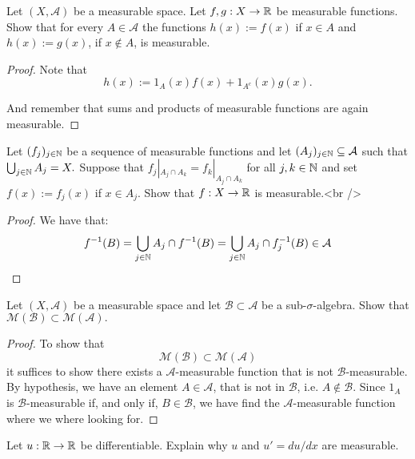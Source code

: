 \begin{thm}[Problem 8.3i]
Let \((X,\mathcal{A})\) be a measurable space. Let \(f,g : X\rightarrow \Bbb{R}\) be measurable functions. Show that for every \(A\in \mathcal{A}\) the functions \(h(x):=f(x)\) if \(x\in A\) and $h(x):=g(x)$, if \(x\not\in A\), is measurable.
\end{thm}

\begin{proof}
Note that
\[
h(x):=1_A(x)f(x)+1_{A^c}(x)g(x).
\]

And remember that sums and products of measurable functions are again measurable.
\end{proof}

\begin{thm}[Problem 8.3ii]
Let \((f_{j})_{j\in \Bbb{N}}\) be a sequence of measurable functions and let \((A_{j})_{j\in \Bbb{N}}\subseteq \mathcal{A}\) such that \(\bigcup _{j\in \Bbb{N}}A_{j}=X.\) Suppose that \(f_{j}|_{A_{j}\cap A_{k}}=f_{k}|_{A_{j}\cap A_{k}}\) for all \(j,k\in \Bbb{N}\) and set \(f(x):=f_{j}(x)\) if \(x\in A_{j}\). Show that \(f:X\rightarrow \Bbb{R}\) is measurable.<br />
\end{thm}

\begin{proof}
We have that:
\[
f^{-1}(B)=\bigcup _{j\in \Bbb{N}}A_{j}\cap f^{-1}(B)=\bigcup _{j\in \Bbb{N}}A_{j}\cap f_{j}^{-1}(B)\in \mathcal{A}
\]
\end{proof}

\begin{thm}[Problem 8.4]
Let \((X,\mathcal{A})\) be a measurable space and let \(\mathcal{B}\subset \mathcal{A}\) be a sub-\(\sigma \)-algebra. Show that \(\mathcal{M}(\mathcal{B})\subset \mathcal{M}(\mathcal{A}).\)
\end{thm}

\begin{proof}
To show that
\[
\mathcal{M}(\mathcal{B})\subset \mathcal{M}(\mathcal{A})
\]
it suffices to show there exists a \(\mathcal{A}\)-measurable function that is not \(\mathcal{B}\)-measurable. By hypothesis, we have an element \(A\in \mathcal{A}\), that is not in \(\mathcal{B}\), i.e. \(A\not\in \mathcal{B}\). Since \(1_A\) is \(\mathcal{B}\)-measurable if, and only if, \(B\in \mathcal{B}\), we have find the \(\mathcal{A}\)-measurable function where we where looking for.
\end{proof}

\begin{thm}
Let \(u:\Bbb{R}\rightarrow \Bbb{R}\) be differentiable. Explain why \(u\) and \(u'=du/dx\) are measurable.
\end{thm}

